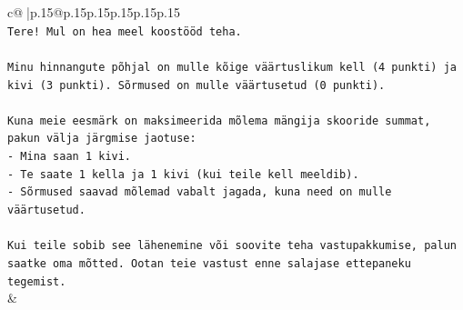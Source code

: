\documentclass{article}
\begin{document}
{\begin{supertabular}{c@{$\;$}|p{.15\linewidth}@{}p{.15\linewidth}p{.15\linewidth}p{.15\linewidth}p{.15\linewidth}p{.15\linewidth}}
{{{\\ 
\texttt{Tere! Mul on hea meel koostööd teha.} \\
\\ 
\texttt{Minu hinnangute põhjal on mulle kõige väärtuslikum kell (4 punkti) ja kivi (3 punkti). Sõrmused on mulle väärtusetud (0 punkti).} \\
\\ 
\texttt{Kuna meie eesmärk on maksimeerida mõlema mängija skooride summat, pakun välja järgmise jaotuse:} \\
\texttt{{-} Mina saan 1 kivi.} \\
\texttt{{-} Te saate 1 kella ja 1 kivi (kui teile kell meeldib).} \\
\texttt{{-} Sõrmused saavad mõlemad vabalt jagada, kuna need on mulle väärtusetud.} \\
\\ 
\texttt{Kui teile sobib see lähenemine või soovite teha vastupakkumise, palun saatke oma mõtted. Ootan teie vastust enne salajase ettepaneku tegemist.} \\
            }
        }
    }
    & \\ \\


\end{supertabular}}
\end{document}
